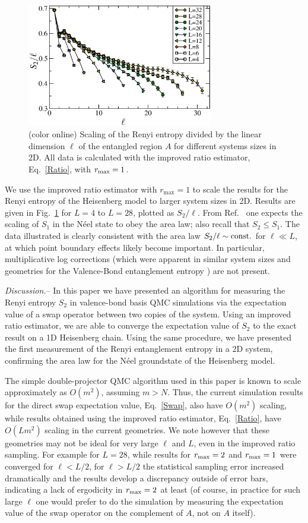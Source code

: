 \documentclass[prl,aps,twocolumn,floatfix,amsmath,amssymb,superscriptaddress,tightenlines]{revtex4}
\begin{document}
\begin{figure} {
\includegraphics[width=3.2in]{fig4.eps} \caption{(color online) 
\label{fig4}
Scaling of the Renyi entropy divided by the linear dimension $\ell$ of the entangled region $A$ for different systems sizes
in 2D.  All data is calculated with the improved ratio estimator, Eq.~\eqref{Ratio}, with $r_{\rm max}=1$.  
}
} \end{figure}

We use the improved ratio estimator with $r_{\max}=1$ to scale the results for the Renyi entropy of the Heisenberg model to larger system sizes in 2D.  Results are given in Fig.~\ref{fig4} for $L=4$ to $L=28$, plotted as $S_2/\ell$.  From  Ref.~\cite{Ann}
one expects the scaling of $S_1$ in the N\'eel state to obey the area law; also recall that $S_2 \leq S_1$.  
The data illustrated is clearly consistent with the area law $S_2/\ell
\sim {\rm const.}$ for $\ell \ll L$, at which point boundary 
effects likely become important.  In particular, multiplicative log corrections (which were apparent in similar system sizes and geometries for the Valence-Bond entanglement entropy
\cite{Alet,Chh}) are not present.

{\it Discussion.}-- 
In this paper we have presented an algorithm for measuring the Renyi entropy $S_2$ in valence-bond basis QMC simulations via
the expectation value of a swap operator between two copies of the system.
Using an improved ratio estimator, we are able to converge the expectation value of $S_2$ to the exact
result on a 1D Heisenberg chain.
Using the same procedure, we have presented the first measurement of the Renyi entanglement entropy in a 2D system, confirming the area law for the N\'eel groundstate of the Heisenberg model.

The simple double-projector QMC algorithm used in this paper is known to scale approximately as $O(m^2)$, \cite{AWSloop}
assuming $m >N$.
Thus, the current simulation results for the direct swap expectation
value, Eq.~\eqref{Swap}, also have
 $O(m^2)$ scaling, while results obtained using the improved ratio
estimator, Eq.~\eqref{Ratio}, have $O(Lm^2)$ scaling in the current geometries.
We note however that these geometries may not be ideal for very large $\ell$ and $L$, even in the improved ratio sampling.
For example for $L=28$, 
while results for $r_{\rm max}=2$ and $r_{\rm max}=1$ were converged for $\ell < L/2$, for $\ell>L/2$ the
statistical sampling error increased dramatically and the results develop a discrepancy outside of error bars, indicating a lack of ergodicity
in $r_{\rm max}=2$ at least (of course, in practice for such large $\ell$ one would prefer to do the simulation by measuring the 
expectation value of the swap operator on the complement of $A$, not on $A$ itself).
\end{document}
